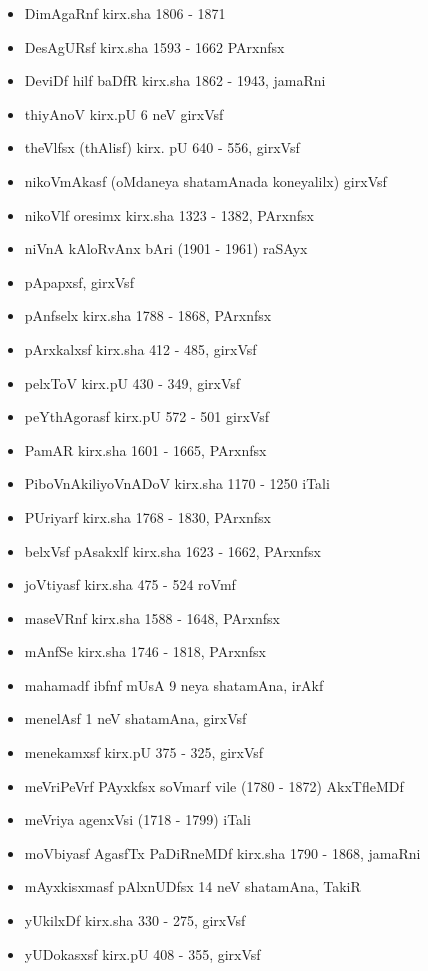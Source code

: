 {\begin{itemize}
\item DimAgaRnf kirx.sha {\rm 1806 - 1871}
\item DesAgURsf kirx.sha {\rm 1593 - 1662} PArxnfsx
\item DeviDf hilf baDfR kirx.sha {\rm 1862 - 1943}, jamaRni
\item thiyAnoV kirx.pU {\rm 6} neV girxVsf
\item theVlfsx (thAlisf) kirx. pU {\rm 640 - 556}, girxVsf
\item nikoVmAkasf (oMdaneya shatamAnada koneyalilx) girxVsf
\item nikoVlf oresimx kirx.sha {\rm 1323 - 1382}, PArxnfsx
\item niVnA kAloRvAnx bAri {\rm (1901 - 1961)} raSAyx
\item pApapxsf, girxVsf
\item pAnfselx kirx.sha {\rm 1788 - 1868}, PArxnfsx
\item pArxkalxsf kirx.sha {\rm 412 - 485}, girxVsf
\item pelxToV kirx.pU {\rm 430 - 349}, girxVsf
\item peYthAgorasf kirx.pU {\rm 572 - 501} girxVsf
\item PamAR kirx.sha {\rm 1601 - 1665}, PArxnfsx
\item PiboVnAkiliyoVnADoV kirx.sha {\rm 1170 - 1250} iTali
\item PUriyarf kirx.sha {\rm 1768 - 1830}, PArxnfsx
\item belxVsf pAsakxlf kirx.sha {\rm 1623 - 1662}, PArxnfsx
\item joVtiyasf kirx.sha {\rm 475 - 524} roVmf
\item maseVRnf kirx.sha {\rm 1588 - 1648}, PArxnfsx
\item mAnfSe kirx.sha {\rm 1746 - 1818}, PArxnfsx
\item mahamadf ibfnf mUsA {\rm 9} neya shatamAna, irAkf
\item menelAsf {\rm 1} neV shatamAna, girxVsf
\item menekamxsf kirx.pU {\rm 375 - 325}, girxVsf 
\item meVriPeVrf PAyxkfsx soVmarf vile {\rm (1780 - 1872)} AkxTfleMDf
\item meVriya agenxVsi {\rm (1718 - 1799)} iTali
\item moVbiyasf AgasfTx PaDiRneMDf kirx.sha {\rm 1790 - 1868}, jamaRni
\item mAyxkisxmasf pAlxnUDfsx {\rm 14} neV shatamAna, TakiR
\item yUkilxDf kirx.sha {\rm 330 - 275}, girxVsf
\item yUDokasxsf kirx.pU {\rm 408 - 355}, girxVsf

\end{itemize}}
